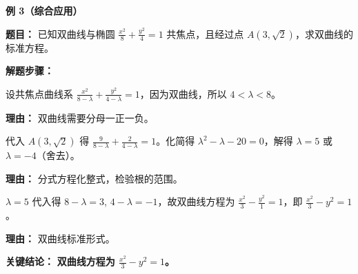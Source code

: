 \begin{examplebox}
	\medskip
	\textbf{\textcolor{CExample}{例 3（综合应用）}}

	\medskip
	\textbf{\textcolor{CExample}{题目：}}
	已知双曲线与椭圆 $\frac{x^{2}}{8}+\frac{y^{2}}{4}=1$ 共焦点，且经过点 $A(3,\sqrt{2})$，求双曲线的标准方程。

	\medskip
	\textbf{\textcolor{CExample}{解题步骤：}}
	\begin{description}[style=nextline,leftmargin=2.8em,labelsep=0.5em,itemsep=0.45em]
		\item[\textbf{第一步（设曲线系）：}]
			设共焦点曲线系 $\frac{x^{2}}{8-\lambda}+\frac{y^{2}}{4-\lambda}=1$，因为双曲线，所以 $4<\lambda<8$。
			\par\textbf{理由：} 双曲线需要分母一正一负。
		\item[\textbf{第二步（代入求λ）：}]
			代入 $A(3,\sqrt{2})$ 得 $\frac{9}{8-\lambda}+\frac{2}{4-\lambda}=1$。化简得 $\lambda^{2}-\lambda-20=0$，解得 $\lambda=5$ 或 $\lambda=-4$（舍去）。
			\par\textbf{理由：} 分式方程化整式，检验根的范围。
		\item[\textbf{第三步（写方程）：}]
			$\lambda=5$ 代入得 $8-\lambda=3$, $4-\lambda=-1$，故双曲线方程为 $\frac{x^{2}}{3}-\frac{y^{2}}{1}=1$，即 $\frac{x^{2}}{3}-y^{2}=1$。
			\par\textbf{理由：} 双曲线标准形式。
	\end{description}
	\textbf{\textcolor{CExample}{关键结论：}}
	\textbf{双曲线方程为 $\frac{x^{2}}{3}-y^{2}=1$。}
\end{examplebox}
